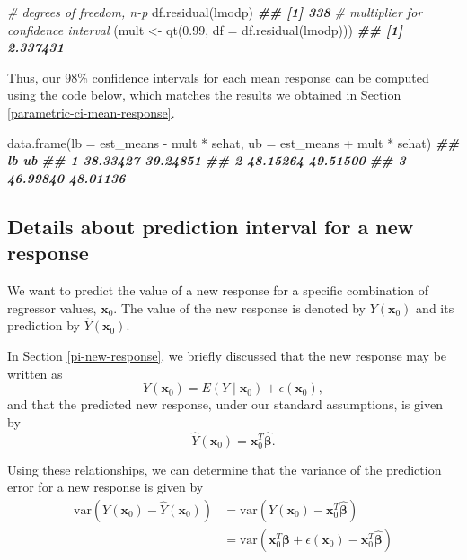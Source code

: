 \documentclass[
]{book}
\newenvironment{Shaded}{\begin{snugshade}}{\end{snugshade}}
\newcommand{\AttributeTok}[1]{\textcolor[rgb]{0.77,0.63,0.00}{#1}}
\newcommand{\CommentTok}[1]{\textcolor[rgb]{0.56,0.35,0.01}{\textit{#1}}}
\newcommand{\DocumentationTok}[1]{\textcolor[rgb]{0.56,0.35,0.01}{\textbf{\textit{#1}}}}
\newcommand{\FloatTok}[1]{\textcolor[rgb]{0.00,0.00,0.81}{#1}}
\newcommand{\FunctionTok}[1]{\textcolor[rgb]{0.00,0.00,0.00}{#1}}
\newcommand{\NormalTok}[1]{#1}
\newcommand{\OtherTok}[1]{\textcolor[rgb]{0.56,0.35,0.01}{#1}}
\newcommand{\SpecialCharTok}[1]{\textcolor[rgb]{0.00,0.00,0.00}{#1}}
\theoremstyle{definition}
\theoremstyle{definition}
\theoremstyle{definition}
\theoremstyle{definition}
\theoremstyle{remark}
\begin{document}
\begin{Shaded}
\begin{Highlighting}[]
\CommentTok{\# degrees of freedom, n{-}p}
\FunctionTok{df.residual}\NormalTok{(lmodp)}
\DocumentationTok{\#\# [1] 338}
\CommentTok{\# multiplier for confidence interval}
\NormalTok{(mult }\OtherTok{\textless{}{-}} \FunctionTok{qt}\NormalTok{(}\FloatTok{0.99}\NormalTok{, }\AttributeTok{df =} \FunctionTok{df.residual}\NormalTok{(lmodp)))}
\DocumentationTok{\#\# [1] 2.337431}
\end{Highlighting}
\end{Shaded}

Thus, our 98\% confidence intervals for each mean response can be computed using the code below, which matches the results we obtained in Section \ref{parametric-ci-mean-response}.

\begin{Shaded}
\begin{Highlighting}[]
\FunctionTok{data.frame}\NormalTok{(}\AttributeTok{lb =}\NormalTok{ est\_means }\SpecialCharTok{{-}}\NormalTok{ mult }\SpecialCharTok{*}\NormalTok{ sehat,}
           \AttributeTok{ub =}\NormalTok{ est\_means }\SpecialCharTok{+}\NormalTok{ mult }\SpecialCharTok{*}\NormalTok{ sehat)}
\DocumentationTok{\#\#         lb       ub}
\DocumentationTok{\#\# 1 38.33427 39.24851}
\DocumentationTok{\#\# 2 48.15264 49.51500}
\DocumentationTok{\#\# 3 46.99840 48.01136}
\end{Highlighting}
\end{Shaded}

\hypertarget{new-response-pi-calculations}{%
\subsection{Details about prediction interval for a new response}\label{new-response-pi-calculations}}

We want to predict the value of a new response for a specific combination of regressor values, \(\mathbf{x}_0\). The value of the new response is denoted by \(Y(\mathbf{x}_0)\) and its prediction by \(\hat{Y}(\mathbf{x}_0)\).

In Section \ref{pi-new-response}, we briefly discussed that the new response may be written as
\[
Y(\mathbf{x}_0) = E(Y \mid \mathbf{x}_0) + \epsilon(\mathbf{x}_0),
\]
and that the predicted new response, under our standard assumptions, is given by
\[
\hat{Y}(\mathbf{x}_0)=\mathbf{x}_0^T\hat{\boldsymbol{\beta}}.
\]

Using these relationships, we can determine that the variance of the prediction error for a new response is given by
\[
\begin{aligned}
\mathrm{var}\left(Y(\mathbf{x}_0)-\hat{Y}(\mathbf{x}_0)\right) &= \mathrm{var}(Y(\mathbf{x}_0)-\mathbf{x}_0^T \hat{\boldsymbol{\beta}}) \\
&= \mathrm{var}(\mathbf{x}_0^T\boldsymbol{\beta} + \epsilon(\mathbf{x}_0)-\mathbf{x}_0^T \hat{\boldsymbol{\beta}}) \\
\end{aligned}
\label{eq:var-pred-error1}
\]
\end{document}
